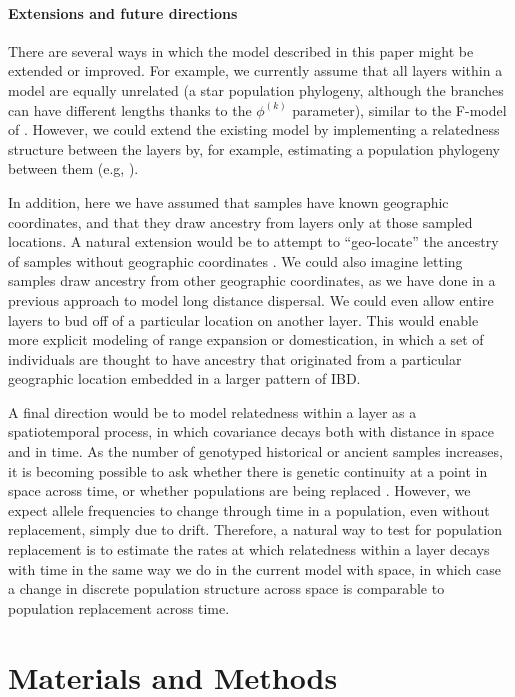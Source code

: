 \documentclass[10pt,letterpaper]{article}
\begin{document}
\paragraph{Extensions and future directions}
There are several ways in which the model described in this paper might be extended or improved.  
For example, we currently assume that all layers within a model are equally unrelated 
(a star population phylogeny, although the branches can have different lengths thanks to the $\phi^{(k)}$ parameter), 
similar to the F-model of \cite{falush2003}.
However, we could extend the existing model by implementing 
a relatedness structure between the layers by, for example, 
estimating a population phylogeny between them
(e.g, \cite{treemix}).

In addition, here we have assumed that samples have known geographic coordinates, 
and that they draw ancestry from layers only at those sampled locations. 
A natural extension would be to attempt to ``geo-locate'' 
the ancestry of samples without geographic coordinates \cite{Wasser2004}. 
We could also imagine letting samples draw ancestry from other geographic coordinates, 
as we have done in a previous approach \cite{spacemix} to model long distance dispersal. 
We could even allow entire layers to bud off of a particular location on another layer. 
This would enable more explicit modeling of range expansion or domestication, 
in which a set of individuals are thought to have ancestry that originated from
a particular geographic location embedded in a larger pattern of IBD.

A final direction would be to model relatedness within a layer as a spatiotemporal process, 
in which covariance decays both with distance in space and in time.  
As the number of genotyped historical or ancient samples increases, 
it is becoming possible to ask whether there is genetic continuity at a point in space across time, 
or whether populations are being replaced \cite{lazaridis_ancient_2014, Haak2015, slatkin_racimo2016, Nielsen2017, Schraiber2017}.
However, we expect allele frequencies to change through time in a population, 
even without replacement, simply due to drift.
Therefore, a natural way to test for population replacement is to estimate the rates 
at which relatedness within a layer decays with time in the same way we do in the current model with space, 
in which case a change in discrete population structure across space is comparable to population replacement across time.

\newpage
\section*{Materials and Methods}
\end{document}

